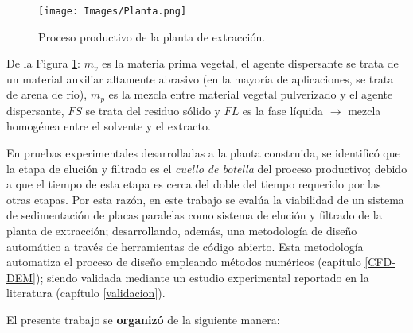 \begin{figure}[h!]
	\centering
	\texttt{[image: Images/Planta.png]}
	\caption{Proceso productivo de la planta de extracci\'on.}
	\label{planta}
\end{figure}

\noindent
\justify

De la Figura \ref{planta}: $m_v$ es la materia prima vegetal, el agente dispersante se trata de un material auxiliar altamente abrasivo (en la mayor\'ia de aplicaciones, se trata de arena de r\'io), $m_p$ es la mezcla entre material vegetal pulverizado y el agente dispersante, $FS$ se trata del residuo s\'olido y $FL$ es la fase l\'iquida $\rightarrow$ mezcla homog\'enea entre el solvente y el extracto.

\noindent
\justify

En pruebas experimentales desarrolladas a la planta construida, se identific\'o que la etapa de eluci\'on y filtrado es el \textit{cuello de botella} del proceso productivo; debido a que el tiempo de esta etapa es cerca del doble del tiempo requerido por las otras etapas. Por esta raz\'on, en este trabajo se eval\'ua la viabilidad de un sistema de sedimentaci\'on de placas paralelas como sistema de eluci\'on y filtrado de la planta de extracci\'on; desarrollando, adem\'as, una metodolog\'ia de dise\~no autom\'atico a trav\'es de herramientas de c\'odigo abierto. Esta metodolog\'ia automatiza el proceso de dise\~no empleando m\'etodos num\'ericos (cap\'itulo \ref{CFD-DEM}); siendo validada mediante un estudio experimental reportado en la literatura (cap\'itulo \ref{validacion}). 

\noindent
\justify

El presente trabajo se \textbf{organiz\'o} de la siguiente manera:

